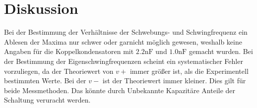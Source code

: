 \section{Diskussion}
\label{sec:Diskussion}
Bei der Bestimmung der Verhältnisse der Schwebungs- und Schwingfrequenz ein
Ablesen der Maxima nur schwer oder garnicht möglich gewesen, weshalb keine Angaben
für die Koppelkondensatoren mit $2.2\si{\nano\farad}$ und $1.0\si{\nano\farad}$
gemacht wurden.
Bei der Bestimmung der Eigenschwingfrequenzen scheint ein systematischer Fehler
vorzuliegen, da der Theoriewert  von $v+$ immer größer ist, als die Experimentell
bestimmten Werte. Bei der $v-$ ist der Theoriewert immer kleiner. Dies gilt für
beide Messmethoden. Das könnte durch Unbekannte Kapazitäre
Anteile der Schaltung veruracht werden.
